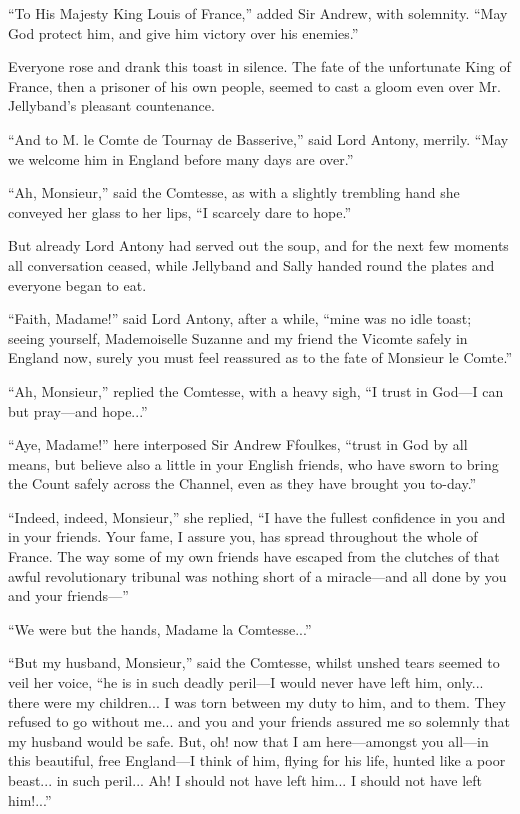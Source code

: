 \documentclass[paper=5.5in:8.5in,BCOR=7mm,twoside,DIV=calc,12pt,usegeometry,chapterprefix,endperiod,headings=big]{scrbook}
\begin{document}
\enquote{To His Majesty King Louis of France,} added Sir Andrew, with solemnity. \enquote{May God protect him, and give him victory over his enemies.}

Everyone rose and drank this toast in silence. The fate of the unfortunate King of France, then a prisoner of his own people, seemed to cast a gloom even over Mr. Jellyband's pleasant countenance.

\enquote{And to M. le Comte de Tournay de Basserive,} said Lord Antony, merrily. \enquote{May we welcome him in England before many days are over.}

\enquote{Ah, Monsieur,} said the Comtesse, as with a slightly trembling hand she conveyed her glass to her lips, \enquote{I scarcely dare to hope.}

But already Lord Antony had served out the soup, and for the next few moments all conversation ceased, while Jellyband and Sally handed round the plates and everyone began to eat.

\enquote{Faith, Madame!} said Lord Antony, after a while, \enquote{mine was no idle toast; seeing yourself, Mademoiselle Suzanne and my friend the Vicomte safely in England now, surely you must feel reassured as to the fate of Monsieur le Comte.}

\enquote{Ah, Monsieur,} replied the Comtesse, with a heavy sigh, \enquote{I trust in God---I can but pray---and hope...}

\enquote{Aye, Madame!} here interposed Sir Andrew Ffoulkes, \enquote{trust in God by all means, but believe also a little in your English friends, who have sworn to bring the Count safely across the Channel, even as they have brought you to-day.}

\enquote{Indeed, indeed, Monsieur,} she replied, \enquote{I have the fullest confidence in you and in your friends. Your fame, I assure you, has spread throughout the whole of France. The way some of my own friends have escaped from the clutches of that awful revolutionary tribunal was nothing short of a miracle---and all done by you and your \newline friends---}

\enquote{We were but the hands, Madame la Comtesse...}

\enquote{But my husband, Monsieur,} said the Comtesse, whilst unshed tears seemed to veil her voice, \enquote{he is in such deadly peril---I would never have left him, only... there were my children... I was torn between my duty to him, and to them. They refused to go without me... and you and your friends assured me so solemnly that my husband would be safe. But, oh! now that I am here---amongst you all---in this beautiful, free England---I think of him, flying for his life, hunted like a poor beast... in such peril... Ah! I should not have left him... I should not have left him!...}
\end{document}
